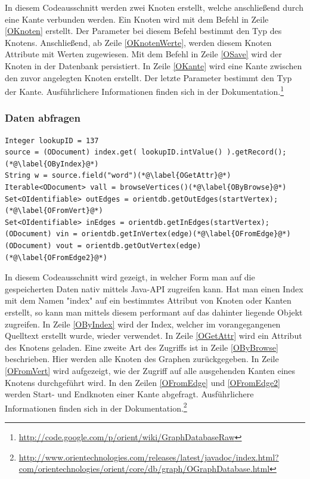 \documentclass[11pt, a4paper, oneside]{article} %
\begin{document}
In diesem Codeausschnitt werden zwei Knoten erstellt, welche anschließend durch eine Kante verbunden werden. Ein Knoten wird mit dem Befehl in Zeile \ref{OKnoten} erstellt. Der Parameter bei diesem Befehl bestimmt den Typ des Knotens. Anschließend, ab Zeile \ref{OKnotenWerte}, werden diesem Knoten Attribute mit Werten zugewiesen. Mit dem Befehl in Zeile \ref{OSave} wird der Knoten in der Datenbank persistiert. In Zeile \ref{OKante} wird eine Kante zwischen den zuvor angelegten Knoten erstellt. Der letzte Parameter bestimmt den Typ der Kante.
Ausführlichere Informationen finden sich in der Dokumentation.\footnote{\url{http://code.google.com/p/orient/wiki/GraphDatabaseRaw}}

\subsubsection{Daten abfragen}

\begin{lstlisting}[caption={OrientDB - Daten abfragen}]
Integer lookupID = 137
source = (ODocument) index.get( lookupID.intValue() ).getRecord();(*@\label{OByIndex}@*)
String w = source.field("word")(*@\label{OGetAttr}@*)
Iterable<ODocument> vall = browseVertices()(*@\label{OByBrowse}@*)
Set<OIdentifiable> outEdges = orientdb.getOutEdges(startVertex); (*@\label{OFromVert}@*)
Set<OIdentifiable> inEdges = orientdb.getInEdges(startVertex);
(ODocument) vin = orientdb.getInVertex(edge)(*@\label{OFromEdge}@*)
(ODocument) vout = orientdb.getOutVertex(edge) (*@\label{OFromEdge2}@*)
\end{lstlisting}

In diesem Codeausschnitt wird gezeigt, in welcher Form man auf die gespeicherten Daten nativ mittels Java-API zugreifen kann. Hat man einen Index mit dem Namen "index" auf ein bestimmtes Attribut von Knoten oder Kanten erstellt, so kann man mittels diesem performant auf das dahinter liegende Objekt zugreifen. In Zeile \ref{OByIndex} wird der Index, welcher im vorangegangenen Quelltext erstellt wurde, wieder verwendet. In Zeile \ref{OGetAttr} wird ein Attribut des Knotens geladen. 
Eine zweite Art des Zugriffs ist in Zeile \ref{OByBrowse} beschrieben. Hier werden alle Knoten des Graphen zurückgegeben. In Zeile \ref{OFromVert} wird aufgezeigt, wie der Zugriff auf alle ausgehenden Kanten eines Knotens durchgeführt wird. In den Zeilen \ref{OFromEdge} und \ref{OFromEdge2} werden Start- und Endknoten einer Kante abgefragt. Ausführlichere Informationen finden sich in der Dokumentation.\footnote{\url{http://www.orientechnologies.com/releases/latest/javadoc/index.html?com/orientechnologies/orient/core/db/graph/OGraphDatabase.html}}
\end{document}
